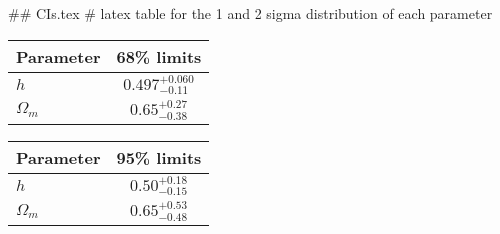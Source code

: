 ## CIs.tex
# latex table for the 1 and 2 sigma distribution of each parameter

\begin{tabular} { l  c}
 Parameter &  68\% limits\\
\hline
{\boldmath$h              $} & $0.497^{+0.060}_{-0.11}    $\\
{\boldmath$\Omega_m       $} & $0.65^{+0.27}_{-0.38}      $\\
\hline
\end{tabular}

\begin{tabular} { l  c}
 Parameter &  95\% limits\\
\hline
{\boldmath$h              $} & $0.50^{+0.18}_{-0.15}      $\\
{\boldmath$\Omega_m       $} & $0.65^{+0.53}_{-0.48}      $\\
\hline
\end{tabular}
